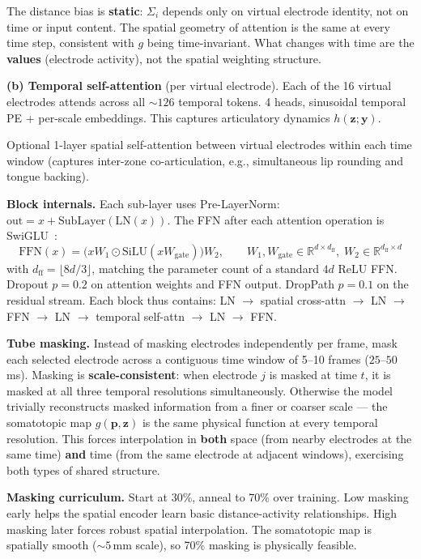 \documentclass[11pt,letterpaper]{article}
\newcommand{\bfp}{\mathbf{p}}
\newcommand{\bfz}{\mathbf{z}}
\newcommand{\bfy}{\mathbf{y}}
\newcommand{\R}{\mathbb{R}}
\begin{document}
The distance bias is \textbf{static}: $\Sigma_i$ depends only on virtual electrode identity, not on time or input content. The spatial geometry of attention is the same at every time step, consistent with $g$ being time-invariant. What changes with time are the \textbf{values} (electrode activity), not the spatial weighting structure.

\textbf{(b) Temporal self-attention} (per virtual electrode). Each of the 16 virtual electrodes attends across all ${\sim}126$ temporal tokens. 4 heads, sinusoidal temporal PE + per-scale embeddings. This captures articulatory dynamics $h(\bfz; \bfy)$.

Optional 1-layer spatial self-attention between virtual electrodes within each time window (captures inter-zone co-articulation, e.g., simultaneous lip rounding and tongue backing).

\textbf{Block internals.} Each sub-layer uses Pre-LayerNorm: $\text{out} = x + \text{SubLayer}(\text{LN}(x))$. The FFN after each attention operation is SwiGLU~\cite{shazeer2020}:
\begin{equation}
\text{FFN}(x) = \bigl(x W_1 \odot \text{SiLU}(x W_{\text{gate}})\bigr) W_2, \qquad W_1, W_{\text{gate}} \in \R^{d \times d_{\text{ff}}},\; W_2 \in \R^{d_{\text{ff}} \times d}
\end{equation}
with $d_{\text{ff}} = \lfloor 8d/3 \rfloor$, matching the parameter count of a standard $4d$ ReLU FFN. Dropout $p{=}0.2$ on attention weights and FFN output. DropPath $p{=}0.1$ on the residual stream. Each block thus contains: LN $\to$ spatial cross-attn $\to$ LN $\to$ FFN $\to$ LN $\to$ temporal self-attn $\to$ LN $\to$ FFN.

\textbf{Tube masking.} Instead of masking electrodes independently per frame, mask each selected electrode across a contiguous time window of 5--10 frames ($25$--$50$\,ms). Masking is \textbf{scale-consistent}: when electrode $j$ is masked at time $t$, it is masked at all three temporal resolutions simultaneously. Otherwise the model trivially reconstructs masked information from a finer or coarser scale --- the somatotopic map $g(\bfp, \bfz)$ is the same physical function at every temporal resolution. This forces interpolation in \textbf{both} space (from nearby electrodes at the same time) \textbf{and} time (from the same electrode at adjacent windows), exercising both types of shared structure.

\textbf{Masking curriculum.} Start at 30\%, anneal to 70\% over training. Low masking early helps the spatial encoder learn basic distance-activity relationships. High masking later forces robust spatial interpolation. The somatotopic map is spatially smooth (${\sim}5$\,mm scale), so 70\% masking is physically feasible.
\end{document}
